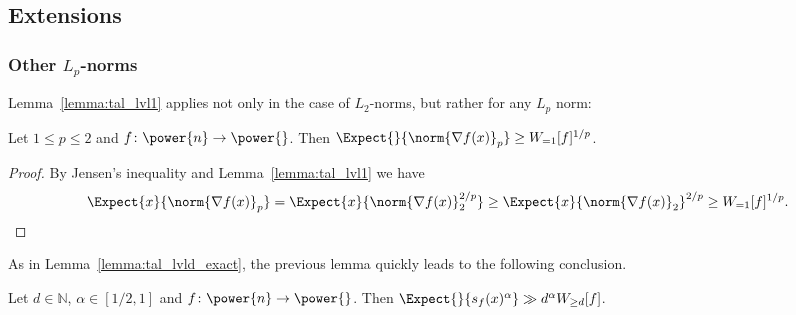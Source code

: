 \subsection{Extensions}
\subsubsection{Other $L_p$-norms}
Lemma~\ref{lemma:tal_lvl1} applies not only in the case of $L_2$-norms, but rather for any $L_p$ norm:
\begin{lemma}\label{lemma:tal_lvl1_L_p}
  Let $1\leq p\leq 2$ and $f\colon\power{n}\to\power{}$. Then
  $\Expect{}{\norm{\nabla f(x)}_p }\geq W_{=1}[f]^{1/p}$.
\end{lemma}
\begin{proof}
By Jensen's inequality and Lemma~\ref{lemma:tal_lvl1} we have
  \[
  \Expect{x}{\norm{\nabla f(x)}_p }
  =\Expect{x}{\norm{\nabla f(x)}_2^{2/p}}
  \geq \Expect{x}{\norm{\nabla f(x)}_2}^{2/p}
  \geq W_{=1}[f]^{1/p}.
  \qedhere
  \]
\end{proof}
As in Lemma~\ref{lemma:tal_lvld_exact}, the previous lemma quickly leads to the following conclusion.
\begin{lemma}\label{lemma:tal_lvld_above_alpha}
  Let $d\in\mathbb{N}$, $\alpha\in[1/2, 1]$ and $f\colon\power{n}\to\power{}$.
  Then $\Expect{}{s_f(x)^{\alpha}}\gg d^{\alpha} W_{\geq d}[f]$.
\end{lemma}

